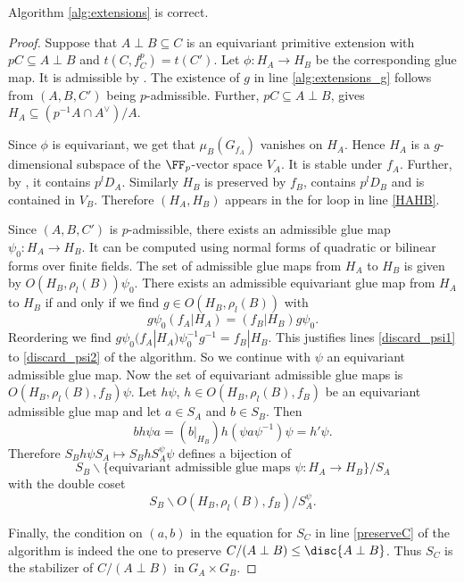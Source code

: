 \begin{lemma}
 Algorithm \ref{alg:extensions} is correct.
\end{lemma}

\begin{proof}
 Suppose that $A \perp B \subseteq C$ is an equivariant
 primitive extension with $pC \subseteq A \perp B$ and $t(C,f_C^p)=t(C')$. Let $\phi \colon H_A \to H_B$ be the corresponding glue map. It is admissible by .
 The existence of $g$ in line \ref{alg:extensions_g} follows from $(A,B,C')$ being $p$-admissible.
 Further, $p C \subseteq A \perp B$, gives $H_A \subseteq (p^{-1}A\cap A^\vee)/A$.

 Since $\phi$ is equivariant, we get that $\mu_B(G_{f_A})$ vanishes on $H_A$.
 Hence $H_A$ is a $g$-dimensional subspace of the $\FF_p$-vector space $V_A$.
 It is stable under $f_A$. Further, by , it contains $p^l D_A$.
 Similarly $H_B$ is preserved by $f_B$, contains $p^l D_B$ and is contained in $V_B$. Therefore $(H_A,H_B)$ appears in the for loop in line \ref{HAHB}.

 Since $(A,B,C')$ is $p$-admissible,
 there exists an admissible glue map
 $\psi_0\colon H_A \to H_B$. It can be computed using normal forms of quadratic or bilinear forms over finite fields.
 The set of admissible glue maps from $H_A$ to $H_B$ is given by $O(H_B, \rho_l(B))\psi_0$.
 There exists an admissible equivariant glue map from $H_A$ to $H_B$ if and only if we find $g \in O(H_B,\rho_l(B))$ with
 \[g \psi_0  (f_A|H_A) = (f_B|H_B) g \psi_0.\]
 Reordering we find $g  \psi_0  (f_A|H_A) \psi_0^{-1}  g^{-1} = f_B|H_B$.
 This justifies lines \ref{discard_psi1} to \ref{discard_psi2} of the algorithm. So we continue with $\psi$ an equivariant admissible glue map.
 Now the set of equivariant admissible glue maps is $O(H_B,\rho_l(B),f_B)\psi$.
 Let $h \psi$, $h \in O(H_B,\rho_l(B),f_B)$ be an equivariant admissible glue map and let $a \in S_A$ and $b \in S_B$.
 Then
 \[b h\psi a = (b|_{H_B}) h (\psi a \psi^{-1}) \psi = h' \psi.\]
 Therefore $S_B h\psi S_A \mapsto S_B h S_A^{\psi} \psi$ defines a bijection of
 \[S_B \backslash \{\mbox{equivariant admissible glue maps } \psi\colon H_A \to  H_B\}/S_A \]
 with the double coset
\[ S_B \backslash O(H_B,\rho_l(B),f_B)/S_A^\psi.\]

 Finally, the condition on $(a,b)$ in the equation for $S_C$ in line \ref{preserveC} of the algorithm
 is indeed the one to preserve $C/(A\perp B) \leq \disc{A \perp B}$.
 Thus $S_C$ is the stabilizer of $C/(A \perp B)$ in $G_A \times G_B$.
\end{proof}

